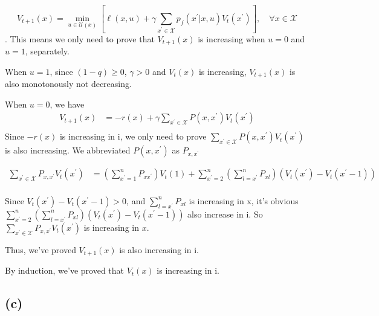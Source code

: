 \documentclass{article} %
\begin{document}
$$V_{t+1}(x)=\min _{u \in \mathcal{U}(x)}\left[\ell(x, u)+\gamma \sum_{x^{\prime} \in \mathcal{X}} p_{f}\left(x^{\prime} | x, u\right) V_{t}\left(x^{\prime}\right)\right], \quad \forall x \in \mathcal{X}$$. This means we only need to prove that $V_{t+1}(x)$ is increasing when $u=0$ and $u=1$, separately.

When $u=1$, since $(1-q) \ge 0$, $\gamma > 0$ and $V_t(x)$ is increasing, $V_{t+1}(x)$ is also monotonously not decreasing.

When $u=0$, we have
\begin{equation*}
    \begin{aligned}
		V_{t+1}(x) &= -r(x)+\gamma \sum_{x^{\prime} \in \mathcal{X}} P\left(x, x^{\prime}\right) V_{t}\left(x^{\prime}\right) \\
    \end{aligned}
\end{equation*}
Since $-r(x)$ is increasing in i, we only need to prove $\sum_{x^{\prime} \in \mathcal{X}} P\left(x, x^{\prime}\right) V_{t}\left(x^{\prime}\right)$ is also increasing. We abbreviated $P\left(x, x^{\prime}\right)$ as $P_{x, x^{\prime}}$ 

\begin{equation*}
    \begin{aligned}
		\sum_{x^{\prime} \in \mathcal{X}} P_{x, x^{\prime}} V_{t}\left(x^{\prime}\right) &= \left(\sum_{x^{\prime}=1}^{n} P_{x x^{\prime}}\right) V_t(1)+\sum_{x^{\prime}=2}^{n}\left(\sum_{l=x^{\prime}}^{n} P_{x l}\right)\left(V_t(x^{\prime})-V_t(x^{\prime}-1)\right) \\
    \end{aligned}
\end{equation*}

Since $V_t(x^{\prime})-V_t(x^{\prime}-1) > 0$, and $\sum_{l=x^{\prime}}^{n} P_{x l}$ is increasing in x, it's obvious $\sum_{x^{\prime}=2}^{n}\left(\sum_{l=x^{\prime}}^{n} P_{x l}\right)\left(V_{t}\left(x^{\prime}\right)-V_{t}\left(x^{\prime}-1\right)\right)$ also increase in i. So $\sum_{x^{\prime} \in \mathcal{X}} P_{x, x^{\prime}} V_{t}\left(x^{\prime}\right)$ is increasing in $x$.

Thus, we've proved $V_{t+1}(x)$ is also increasing in i.

By induction, we've proved that $V_{t}(x)$ is increasing in i.

\subsection{(c)}
\end{document}
